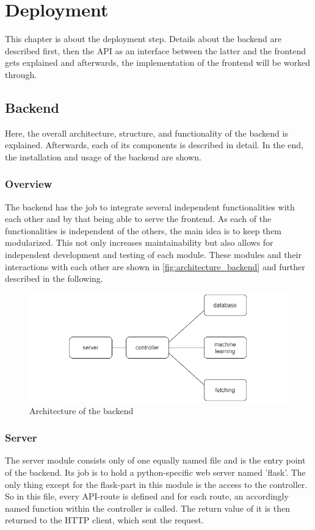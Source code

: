 
\chapter{Deployment}
This chapter is about the deployment step. Details about the backend are described first, then the API as an interface between the latter and the frontend gets explained and afterwards, the implementation of the frontend will be worked through.
\section{Backend}
Here, the overall architecture, structure, and functionality of the backend is explained. Afterwards, each of its components is described in detail. In the end, the installation and usage of the backend are shown.
\subsection{Overview}
The backend has the job to integrate several independent functionalities with each other and by that being able to serve the frontend.
As each of the functionalities is independent of the others, the main idea is to keep them modularized. This not only increases maintainability but also allows for independent development and testing of each module. These modules and their interactions with each other are shown in \autoref{fig:architecture_backend} and further described in the following.
\begin{figure}[H]
\centering
\includegraphics[width=1\textwidth]{images/modules.png}
\caption{Architecture of the backend}
\label{fig:architecture_backend}
\end{figure}

\subsection{Server}
The server module consists only of one equally named file and is the entry point of the backend. Its job is to hold a python-specific web server named 'flask'. The only thing except for the flask-part in this module is the access to the controller.
\newline
So in this file, every API-route is defined and for each route, an accordingly named function within the controller is called. The return value of it is then returned to the HTTP client, which sent the request.

